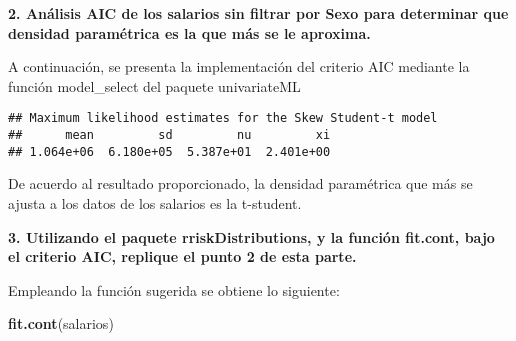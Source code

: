 \documentclass[
]{article}
\newenvironment{Shaded}{\begin{snugshade}}{\end{snugshade}}
\newcommand{\AttributeTok}[1]{\textcolor[rgb]{0.13,0.29,0.53}{#1}}
\newcommand{\CommentTok}[1]{\textcolor[rgb]{0.56,0.35,0.01}{\textit{#1}}}
\newcommand{\ConstantTok}[1]{\textcolor[rgb]{0.56,0.35,0.01}{#1}}
\newcommand{\FunctionTok}[1]{\textcolor[rgb]{0.13,0.29,0.53}{\textbf{#1}}}
\newcommand{\NormalTok}[1]{#1}
\newcommand{\OtherTok}[1]{\textcolor[rgb]{0.56,0.35,0.01}{#1}}
\newcommand{\SpecialCharTok}[1]{\textcolor[rgb]{0.81,0.36,0.00}{\textbf{#1}}}
\newcommand{\StringTok}[1]{\textcolor[rgb]{0.31,0.60,0.02}{#1}}
\begin{document}
\textbf{2. Análisis AIC de los salarios sin filtrar por Sexo para
determinar que densidad paramétrica es la que más se le aproxima.}

A continuación, se presenta la implementación del criterio AIC mediante
la función model\_select del paquete univariateML

\begin{Shaded}
\end{Shaded}

\begin{verbatim}
## Maximum likelihood estimates for the Skew Student-t model 
##      mean         sd         nu         xi  
## 1.064e+06  6.180e+05  5.387e+01  2.401e+00
\end{verbatim}

De acuerdo al resultado proporcionado, la densidad paramétrica que más
se ajusta a los datos de los salarios es la t-student.

\textbf{3. Utilizando el paquete rriskDistributions, y la función
fit.cont, bajo el criterio AIC, replique el punto 2 de esta parte.}

Empleando la función sugerida se obtiene lo siguiente:

\begin{Shaded}
\begin{Highlighting}[]
\FunctionTok{fit.cont}\NormalTok{(salarios)}
\end{Highlighting}
\end{Shaded}
\end{document}
